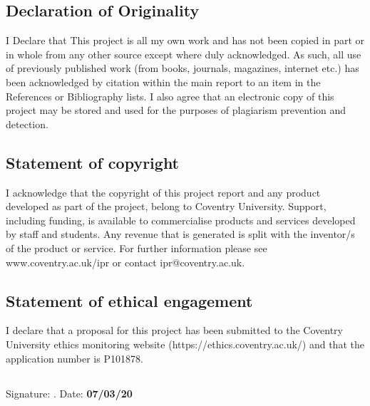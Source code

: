 \subsection*{Declaration of Originality}
I Declare that This project is all my own work and has not been copied in part or in whole from any other source except where duly acknowledged.  As such, all use of previously published work (from books, journals, magazines, internet etc.) has been acknowledged by citation within the main report to an item in the References or Bibliography lists. I also agree that an electronic copy of this project may be stored and used for the purposes of plagiarism prevention and detection.
\subsection*{Statement of copyright}
I acknowledge that the copyright of this project report and any product developed as part of the project, belong to Coventry University. 
Support, including funding, is available to commercialise products and services developed by staff and students. 
 Any revenue that is generated is split with the inventor/s of the product or service. 
For further information please see www.coventry.ac.uk/ipr or contact ipr@coventry.ac.uk.
\subsection*{Statement of ethical engagement}

I declare that a proposal for this project has been submitted to the Coventry University ethics monitoring website (https://ethics.coventry.ac.uk/) and that the application number is P101878.
\subsection*{}
Signature:  . \hspace{40mm}  Date:  \textbf{07/03/20}

